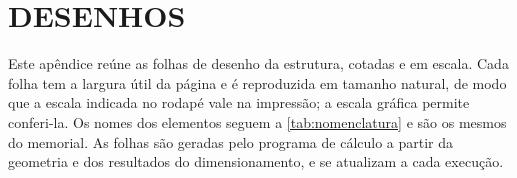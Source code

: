 
\chapter{DESENHOS}\label{ap:desenhos}

Este apêndice reúne as folhas de desenho da estrutura, cotadas e em escala. Cada
folha tem a largura útil da página e é reproduzida em tamanho natural, de modo que
a escala indicada no rodapé vale na impressão; a escala gráfica permite conferi-la.
Os nomes dos elementos seguem a \autoref{tab:nomenclatura} e são os mesmos do
memorial. As folhas são geradas pelo programa de cálculo a partir da geometria e
dos resultados do dimensionamento, e se atualizam a cada execução.

